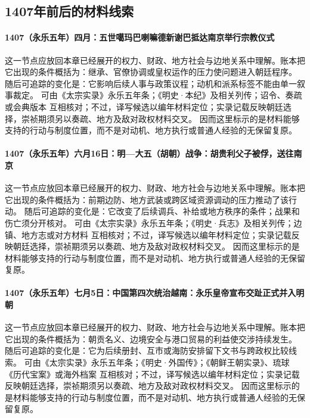 \subsection{1407年前后的材料线索}

\paragraph{1407（永乐五年）四月：五世噶玛巴喇嘛德新谢巴抵达南京举行宗教仪式} 这一节点应放回本章已经展开的权力、财政、地方社会与边地关系中理解。账本把它出现的条件概括为：继承、官僚协调或皇权运作的压力使问题进入朝廷程序。 随后可追踪的变化是：它影响后续人事与政策议程；动机和派系标签不能由单一叙事裁定。 可由《太宗实录》永乐五年条；《明史·本纪》及相关列传；诏令、奏疏或会典版本 互相核对；不过，译写候选以编年材料定位；实录记载反映朝廷选择，崇祯期须另以奏疏、地方及敌对政权材料交叉。 因而这里标示的是材料能够支持的行动与制度位置，而不是对动机、地方执行或普通人经验的无保留复原。

\paragraph{1407（永乐五年）六月16日：明—大五（胡朝）战争：胡贵利父子被俘，送往南京} 这一节点应放回本章已经展开的权力、财政、地方社会与边地关系中理解。账本把它出现的条件概括为：前期边防、地方武装或跨区域资源调动的压力推动了该行动。 随后可追踪的变化是：它改变了后续调兵、补给或地方秩序的条件；战果和伤亡须分开核对。 可由《太宗实录》永乐五年条；《明史·兵志》及相关列传；边镇、地方志或对方材料 互相核对；不过，译写候选以编年材料定位；实录记载反映朝廷选择，崇祯期须另以奏疏、地方及敌对政权材料交叉。 因而这里标示的是材料能够支持的行动与制度位置，而不是对动机、地方执行或普通人经验的无保留复原。

\paragraph{1407（永乐五年）七月5日：中国第四次统治越南：永乐皇帝宣布交趾正式并入明朝} 这一节点应放回本章已经展开的权力、财政、地方社会与边地关系中理解。账本把它出现的条件概括为：朝贡名义、边境安全与港口贸易的利益使交涉持续发生。 随后可追踪的变化是：它为后续册封、互市或海防安排留下文书与跨政权比较线索。 可由《太宗实录》永乐五年条；《明史·外国传》；《朝鲜王朝实录》、琉球《历代宝案》或海外档案 互相核对；不过，译写候选以编年材料定位；实录记载反映朝廷选择，崇祯期须另以奏疏、地方及敌对政权材料交叉。 因而这里标示的是材料能够支持的行动与制度位置，而不是对动机、地方执行或普通人经验的无保留复原。


